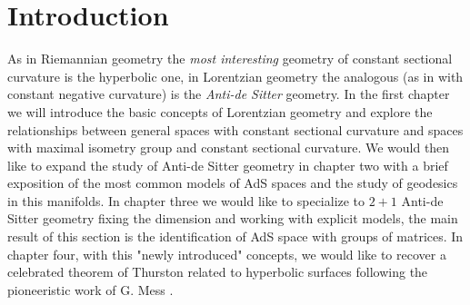 \chapter{Introduction}

As in Riemannian geometry the \textit{most interesting} geometry of constant sectional curvature is the hyperbolic one, in Lorentzian geometry the analogous (as in with constant negative curvature) is the \textit{Anti-de Sitter} geometry. In the first chapter we will introduce the basic concepts of Lorentzian geometry and explore the relationships between general spaces with constant sectional curvature and spaces with maximal isometry group and constant sectional curvature.
We would then like to expand the study of Anti-de Sitter geometry in chapter two with a brief exposition of the most common models of AdS spaces and the study of geodesics in this manifolds. 
In chapter three we would like to specialize to $2+1$ Anti-de Sitter geometry fixing the dimension and working with explicit models, the main result of this section is the identification of AdS space with groups of matrices. 
In chapter four, with this "newly introduced" concepts, we would like to recover a celebrated theorem of Thurston related to hyperbolic surfaces following the pioneeristic work of G. Mess \cite{Mess}.